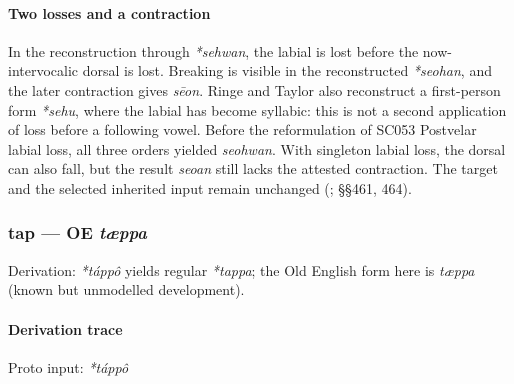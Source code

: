 \documentclass[
  british,
  a4paper,
]{article}
\providecommand{\Recon}[1]{\emph{*#1}}
\begin{document}
\paragraph{Two losses and a
contraction}\label{two-losses-and-a-contraction}

In the reconstruction through \emph{*sehwan}, the labial is lost before
the now-intervocalic dorsal is lost. Breaking is visible in the
reconstructed \emph{*seohan}, and the later contraction gives
\emph{sēon}. Ringe and Taylor also reconstruct a first-person form
\emph{*sehu}, where the labial has become syllabic: this is not a second
application of loss before a following vowel. Before the reformulation
of SC053 Postvelar labial loss, all three orders yielded \emph{seohwan}.
With singleton labial loss, the dorsal can also fall, but the result
\emph{seoan} still lacks the attested contraction. The target and the
selected inherited input remain unchanged
(;
 §§461, 464).

\subsubsection{\texorpdfstring{tap --- OE
\emph{tæppa}}{tap --- OE tæppa}}\label{tap-oe-tuxe6ppa}

Derivation: \emph{*táppô} yields regular \Recon{tappa}; the Old English
form here is \emph{tæppa} (known but unmodelled development).

\paragraph{Derivation trace}\label{derivation-trace-181}

Proto input: \emph{*táppô}

\begingroup
\setlength{\fboxsep}{6pt}
\end{document}
